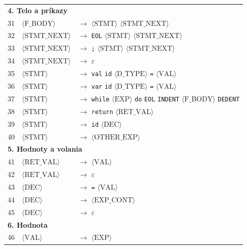 \begin{longtable}{l l l}
\midrule
\multicolumn{3}{l}{\textbf{4. Telo a príkazy}} \\[2pt]
31 & $\langle\text{F\_BODY}\rangle$ & $\rightarrow$ $\langle\text{STMT}\rangle$ $\langle\text{STMT\_NEXT}\rangle$ \\
32 & $\langle\text{STMT\_NEXT}\rangle$ & $\rightarrow$ \texttt{EOL} $\langle\text{STMT}\rangle$ $\langle\text{STMT\_NEXT}\rangle$ \\
33 & $\langle\text{STMT\_NEXT}\rangle$ & $\rightarrow$ \texttt{;} $\langle\text{STMT}\rangle$ $\langle\text{STMT\_NEXT}\rangle$ \\
34 & $\langle\text{STMT\_NEXT}\rangle$ & $\rightarrow$ $\varepsilon$ \\
35 & $\langle\text{STMT}\rangle$ & $\rightarrow$ \texttt{val} \texttt{id} $\langle\text{D\_TYPE}\rangle$ \texttt{=} $\langle\text{VAL}\rangle$ \\
36 & $\langle\text{STMT}\rangle$ & $\rightarrow$ \texttt{var} \texttt{id} $\langle\text{D\_TYPE}\rangle$ \texttt{=} $\langle\text{VAL}\rangle$ \\
37 & $\langle\text{STMT}\rangle$ & $\rightarrow$ \texttt{while} $\langle\text{EXP}\rangle$ \texttt{do} \texttt{EOL} \texttt{INDENT} $\langle\text{F\_BODY}\rangle$ \texttt{DEDENT} \\
38 & $\langle\text{STMT}\rangle$ & $\rightarrow$ \texttt{return} $\langle\text{RET\_VAL}\rangle$ \\
39 & $\langle\text{STMT}\rangle$ & $\rightarrow$ \texttt{id} $\langle\text{DEC}\rangle$ \\
40 & $\langle\text{STMT}\rangle$ & $\rightarrow$ $\langle\text{OTHER\_EXP}\rangle$ \\
\midrule
\multicolumn{3}{l}{\textbf{5. Hodnoty a volania}} \\[2pt]
41 & $\langle\text{RET\_VAL}\rangle$ & $\rightarrow$ $\langle\text{VAL}\rangle$ \\
42 & $\langle\text{RET\_VAL}\rangle$ & $\rightarrow$ $\varepsilon$ \\
43 & $\langle\text{DEC}\rangle$ & $\rightarrow$ \texttt{=} $\langle\text{VAL}\rangle$ \\
44 & $\langle\text{DEC}\rangle$ & $\rightarrow$ $\langle\text{EXP\_CONT}\rangle$ \\
45 & $\langle\text{DEC}\rangle$ & $\rightarrow$ $\varepsilon$ \\
\midrule
\multicolumn{3}{l}{\textbf{6. Hodnota}} \\[2pt]
46 & $\langle\text{VAL}\rangle$ & $\rightarrow$ $\langle\text{EXP}\rangle$ \\

\end{longtable}
